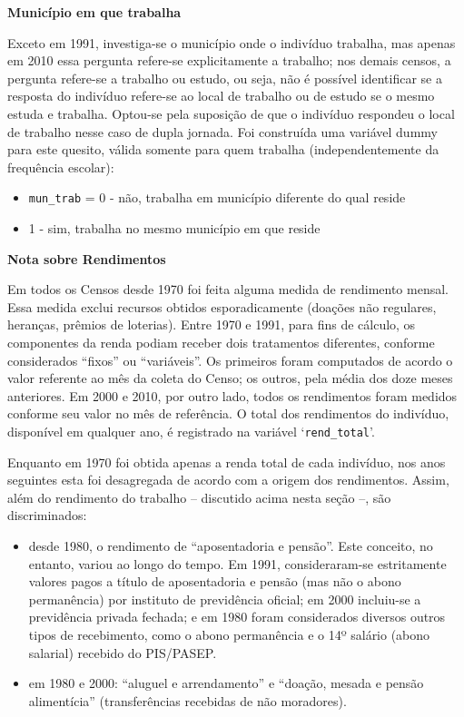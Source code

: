 \documentclass[12pt,a4paper]{article}
\newcommand{\vr}[1]{\texttt{#1}}
\begin{document}
\medskip
\textbf{Município em que trabalha}

Exceto em 1991, investiga-se o município onde o indivíduo trabalha, mas apenas em 2010 essa pergunta refere-se explicitamente a trabalho; nos demais censos, a pergunta refere-se a trabalho ou estudo, ou seja, não é possível identificar se a resposta do indivíduo refere-se ao local de trabalho ou de estudo se o mesmo estuda e trabalha. Optou-se pela suposição de que o indivíduo respondeu o local de trabalho nesse caso de dupla jornada. Foi construída uma variável dummy para este quesito, válida somente para quem trabalha (independentemente da frequência escolar):
\begin{itemize}
  \item \vr{mun\_trab} = 0 - não, trabalha em município diferente do qual reside
  \item 1 - sim, trabalha no mesmo município em que reside
\end{itemize}

\medskip
\textbf{Nota sobre Rendimentos}

Em todos os Censos desde 1970 foi feita alguma medida de rendimento mensal. Essa medida exclui recursos obtidos esporadicamente (doações não regulares, heranças, prêmios de loterias). Entre 1970 e 1991, para fins de cálculo, os componentes da renda podiam receber dois tratamentos diferentes, conforme considerados “fixos” ou “variáveis”. Os primeiros foram computados de acordo o valor referente ao mês da coleta do Censo; os outros, pela média dos doze meses anteriores. Em 2000 e 2010, por outro lado, todos os rendimentos foram medidos conforme seu valor no mês de referência. O total dos rendimentos do indivíduo, disponível em qualquer ano, é registrado na variável ‘\vr{rend\_total}’.

Enquanto em 1970 foi obtida apenas a renda total de cada indivíduo, nos anos seguintes esta foi desagregada de acordo com a origem dos rendimentos. Assim, além do rendimento do trabalho -- discutido acima nesta seção --, são discriminados:
\begin{itemize}
  \item desde 1980, o rendimento de “aposentadoria e pensão”. Este conceito, no entanto, variou ao longo do tempo. Em 1991, consideraram-se estritamente valores pagos a título de aposentadoria e pensão (mas não o abono permanência) por instituto de previdência oficial; em 2000 incluiu-se a previdência privada fechada; e em 1980 foram considerados diversos outros tipos de recebimento, como o abono permanência e o 14º salário (abono salarial) recebido do PIS/PASEP.
  \item em 1980 e 2000: “aluguel e arrendamento” e “doação, mesada e pensão alimentícia” (transferências recebidas de não moradores).
\end{itemize}
\end{document}
